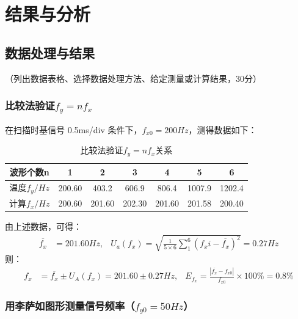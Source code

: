 \documentclass[10pt,a4paper]{ctexart}
\newcommand{\xiaosi}{\fontsize{12pt}{16pt}\selectfont}
\begin{document}
    
\section{结果与分析}

    \subsection{数据处理与结果}
    \xiaosi （列出数据表格、选择数据处理方法、给定测量或计算结果，30分）

    \subsubsection*{比较法验证\(f_y = nf_x\)}

    在扫描时基信号 0.5ms/div 条件下，\(f_{x0}=200Hz\)，测得数据如下：
    \begin{table}[htbp]
        \centering %
        \caption{比较法验证\(f_y = nf_x\)关系} %
        \label{tab:resistance_data} %
        \begin{tabular}{*{7}{c}} %
            \toprule %
            波形个数n & 1 & 2 & 3 & 4 & 5 & 6 \\
            \midrule %
            温度$f_y/Hz$ & 200.60 & 403.2 & 606.9 & 806.4 & 1007.9 & 1202.4 \\
            计算$f_x/Hz$ & 200.60 & 201.60 & 202.30 & 201.60 & 201.58 & 200.40 \\
            \bottomrule %
        \end{tabular}
    \end{table}

    由上述数据，可得：
    \begin{align*}
        \overline{f_x} &= 201.60Hz , & U_a(f_x) = \sqrt{\frac{1}{5\times 6}\sum_{1}^{6}(f_xi - \overline{f_x})^2} = 0.27Hz
    \end{align*}
    则：
    \begin{align*}
        f_x &= \overline{f_x} \pm  U_A(f_x) = 201.60 \pm 0.27Hz , & E_{f_x} = \frac{|\overline{f_x}-f_{x0}|}{f_{x0}} \times 100\% = 0.8\%
    \end{align*}

    \subsubsection*{用李萨如图形测量信号频率（\(f_{y0}=50Hz\)）}
\end{document}
